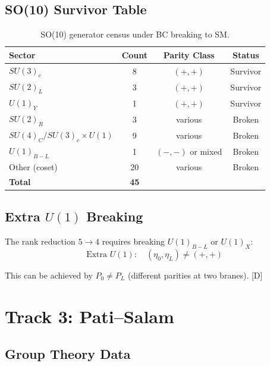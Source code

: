 \documentclass[11pt,a4paper]{article}
\newcommand{\tagD}{\textcolor{blue!70!black}{[D]}}
\begin{document}
\subsection{SO(10) Survivor Table}

\begin{table}[h]
\centering
\begin{tabular}{lccc}
\toprule
Sector & Count & Parity Class & Status \\
\midrule
$SU(3)_c$ & 8 & $(+,+)$ & Survivor \\
$SU(2)_L$ & 3 & $(+,+)$ & Survivor \\
$U(1)_Y$ & 1 & $(+,+)$ & Survivor \\
$SU(2)_R$ & 3 & various & Broken \\
$SU(4)_C/SU(3)_c \times U(1)$ & 9 & various & Broken \\
$U(1)_{B-L}$ & 1 & $(-,-)$ or mixed & Broken \\
Other (coset) & 20 & various & Broken \\
\midrule
\textbf{Total} & \textbf{45} & & \\
\bottomrule
\end{tabular}
\caption{SO(10) generator census under BC breaking to SM.}
\label{tab:so10}
\end{table}

\subsection{Extra $U(1)$ Breaking}

The rank reduction $5 \to 4$ requires breaking $U(1)_{B-L}$ or $U(1)_X$:
\begin{equation}
\label{eq:rank-reduction}
\text{Extra } U(1): \quad (\eta_0, \eta_L) \neq (+,+)
\end{equation}

This can be achieved by $P_0 \neq P_L$ (different parities at two branes). \tagD

\section{Track 3: Pati--Salam}

\subsection{Group Theory Data}
\end{document}
